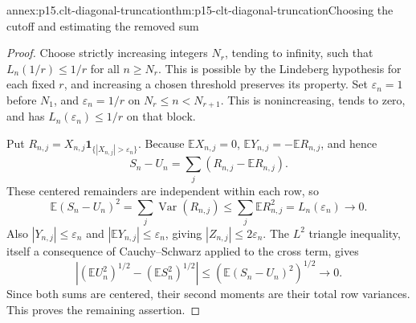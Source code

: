 \begin{annexitem}{annex:p15.clt-diagonal-truncation}{thm:p15-clt-diagonal-truncation}{Choosing the cutoff and estimating the removed sum}
\begin{proof}
Choose strictly increasing integers \(N_r\), tending to infinity,
such that \(L_n(1/r)\leq1/r\) for all \(n\geq N_r\).
This is possible by the Lindeberg hypothesis for each fixed \(r\),
and increasing a chosen threshold preserves its property.
Set \(\varepsilon_n=1\) before \(N_1\), and
\(\varepsilon_n=1/r\) on \(N_r\leq n<N_{r+1}\).
This is nonincreasing, tends to zero, and has
\(L_n(\varepsilon_n)\leq1/r\) on that block.

Put \(R_{n,j}=X_{n,j}\mathbf1_{\{|X_{n,j}|>\varepsilon_n\}}\).
Because \(\mathbb EX_{n,j}=0\),
\(\mathbb EY_{n,j}=-\mathbb ER_{n,j}\), and hence
\[
 S_n-U_n=\sum_j(R_{n,j}-\mathbb ER_{n,j}).
 \]
These centered remainders are independent within each row, so
\[
 \mathbb E(S_n-U_n)^2
 =\sum_j\operatorname{Var}(R_{n,j})
 \leq\sum_j\mathbb ER_{n,j}^2=L_n(\varepsilon_n)\to0.
 \]
Also \(|Y_{n,j}|\leq\varepsilon_n\) and
\(|\mathbb EY_{n,j}|\leq\varepsilon_n\), giving
\(|Z_{n,j}|\leq2\varepsilon_n\).
The \(L^2\) triangle inequality, itself a consequence of
Cauchy--Schwarz applied to the cross term, gives
\[
 \left|(\mathbb EU_n^2)^{1/2}-(\mathbb ES_n^2)^{1/2}\right|
 \leq(\mathbb E(S_n-U_n)^2)^{1/2}\to0.
 \]
Since both sums are centered, their second moments are their
total row variances. This proves the remaining assertion.
\end{proof}
\end{annexitem}

